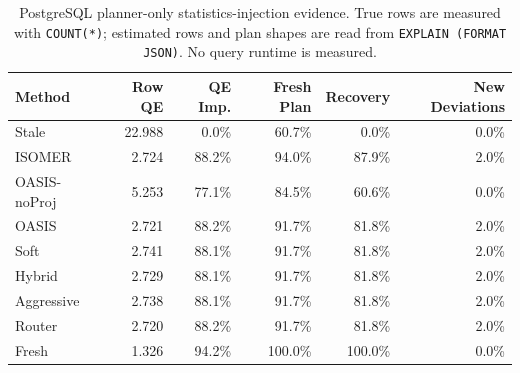 \begin{table}[t]
  \centering
  \small
  \caption{PostgreSQL planner-only statistics-injection evidence. True rows are measured with \texttt{COUNT(*)}; estimated rows and plan shapes are read from \texttt{EXPLAIN (FORMAT JSON)}. No query runtime is measured.}
  \label{tab:postgres_planner_stats_injection}
  \setlength{\tabcolsep}{4pt}
  \begin{tabular}{lrrrrr}
    \toprule
    Method & Row QE & QE Imp. & Fresh Plan & Recovery & New Deviations \\
    \midrule
    Stale & 22.988 & 0.0\% & 60.7\% & 0.0\% & 0.0\% \\
    ISOMER & 2.724 & 88.2\% & 94.0\% & 87.9\% & 2.0\% \\
    OASIS-noProj & 5.253 & 77.1\% & 84.5\% & 60.6\% & 0.0\% \\
    OASIS & 2.721 & 88.2\% & 91.7\% & 81.8\% & 2.0\% \\
    Soft & 2.741 & 88.1\% & 91.7\% & 81.8\% & 2.0\% \\
    Hybrid & 2.729 & 88.1\% & 91.7\% & 81.8\% & 2.0\% \\
    Aggressive & 2.738 & 88.1\% & 91.7\% & 81.8\% & 2.0\% \\
    Router & 2.720 & 88.2\% & 91.7\% & 81.8\% & 2.0\% \\
    Fresh & 1.326 & 94.2\% & 100.0\% & 100.0\% & 0.0\% \\
    \bottomrule
  \end{tabular}
\end{table}
